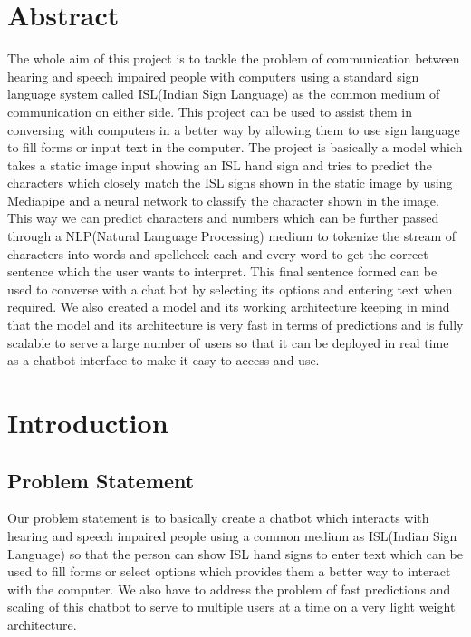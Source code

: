 \documentclass[12pt,a4paper]{report}
\begin{document}
\renewcommand\bibname{References}

\chapter*{Abstract}
The whole aim of this project is to tackle the problem of communication between hearing and speech impaired people with computers using a standard sign language system called ISL(Indian Sign Language) as the common medium of communication on either side. This project can be used to assist them in conversing with computers in a better way by allowing them to use sign language to fill forms or input text in the computer. The project is basically a model which takes a static image input showing an ISL hand sign and tries to predict the characters which closely match the ISL signs shown in the static image by using Mediapipe and a neural network to classify the character shown in the image. This way we can predict characters and numbers which can be further passed through a NLP(Natural Language Processing) medium to tokenize the stream of characters into words and spellcheck each and every word to get the correct sentence which the user wants to interpret. This final sentence formed can be used to converse with a chat bot by selecting its options and entering text when required. We also created a model and its working architecture keeping in mind that the model and its architecture is very fast in terms of predictions and is fully scalable to serve a large number of users so that it can be deployed in real time as a chatbot interface to make it easy to access and use.

\tableofcontents
\listoffigures
\listoftables

\chapter{Introduction}

\section{Problem Statement}
Our problem statement is to basically create a chatbot which interacts with hearing and speech impaired people using a common medium as ISL(Indian Sign Language) so that the person can show ISL hand signs to enter text which can be used to fill forms or select options which provides them a better way to interact with the computer. We also have to address the problem of fast predictions and scaling of this chatbot to serve to multiple users at a time on a very light weight architecture.
\end{document}
